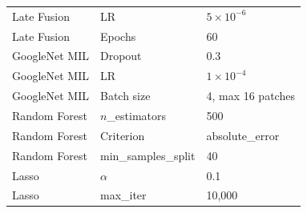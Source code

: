 \documentclass[11pt,a4paper]{article}
\begin{document}
\begin{table}[H]
\begin{tabular}{|l|l|l|}
Late Fusion & LR & $5\times10^{-6}$ \\
Late Fusion & Epochs & 60 \\
GoogleNet MIL & Dropout & 0.3 \\
GoogleNet MIL & LR & $1\times10^{-4}$ \\
GoogleNet MIL & Batch size & 4, max 16 patches \\
Random Forest & $n$\_estimators & 500 \\
Random Forest & Criterion & absolute\_error \\
Random Forest & min\_samples\_split & 40 \\
Lasso & $\alpha$ & 0.1 \\
Lasso & max\_iter & 10{,}000 \\
\hline
\end{tabular}
\end{table}

%
\end{document}

